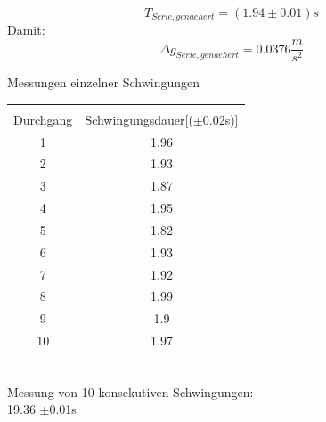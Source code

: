 \documentclass{article}
\begin{document}
\begin{equation}
T_{Serie,genaehert} = (1.94 \pm 0.01)s
\end{equation}
Damit:
\begin{equation}
\Delta g_{Serie,genaehert} = 0.0376 \frac{m}{s^2}
\end{equation}
\begin{table}
\begin{center}
Messungen einzelner Schwingungen\\

\begin{tabular}{|c|c|}
\hline \\
Durchgang & Schwingungsdauer[($\pm$0.02s)]\\
\hline 1&1.96\\
\hline 2&1.93\\
\hline 3&1.87\\
\hline 4&1.95\\
\hline 5&1.82\\
\hline 6&1.93\\
\hline 7&1.92\\
\hline 8&1.99\\
\hline 9&1.9\\
\hline 10&1.97\\
\hline

\end{tabular} \\
Messung von 10 konsekutiven Schwingungen:\\
19.36 $\pm$0.01s
\end{center}
\end{table}
\end{document}

